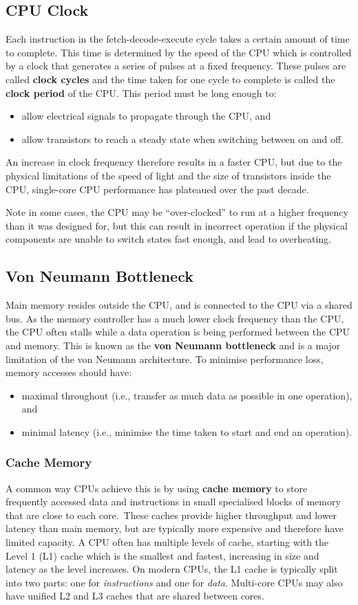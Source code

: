 \documentclass{article}
\begin{document}
\subsection{CPU Clock}
Each instruction in the fetch-decode-execute cycle takes a certain
amount of time to complete. This time is determined by the speed of the
CPU which is controlled by a clock that generates a series of pulses at
a fixed frequency. These pulses are called \textbf{clock cycles} and
the time taken for one cycle to complete is called the \textbf{clock
period} of the CPU. This period must be long enough to:
\begin{itemize}
    \item allow electrical signals to propagate through the CPU, and
    \item allow transistors to reach a steady state when switching
          between on and off.
\end{itemize}
An increase in clock frequency therefore results in a faster CPU, but
due to the physical limitations of the speed of light and the size of
transistors inside the CPU, single-core CPU performance has plateaued
over the past decade.

Note in some cases, the CPU may be ``over-clocked'' to run at a higher
frequency than it was designed for, but this can result in incorrect
operation if the physical components are unable to switch states fast
enough, and lead to overheating.
\subsection{Von Neumann Bottleneck}
Main memory resides outside the CPU, and is connected to the CPU via a
shared bus. As the memory controller has a much lower clock frequency
than the CPU, the CPU often stalls while a data operation is being
performed between the CPU and memory. This is known as the \textbf{von
Neumann bottleneck} and is a major limitation of the von Neumann
architecture. To minimise performance loss, memory accesses should
have:
\begin{itemize}
    \item maximal throughout (i.e., transfer as much data as possible
          in one operation), and
    \item minimal latency (i.e., minimise the time taken to start and
          end an operation).
\end{itemize}
\subsubsection{Cache Memory}
A common way CPUs achieve this is by using \textbf{cache memory} to
store frequently accessed data and instructions in small specialised
blocks of memory that are close to each core.\ These caches provide
higher throughput and lower latency than main memory, but are typically
more expensive and therefore have limited capacity. A CPU often has
multiple levels of cache, starting with the Level 1 (L1) cache which is
the smallest and fastest, increasing in size and latency as the level
increases. On modern CPUs, the L1 cache is typically split into two
parts: one for \textit{instructions} and one for \textit{data}.
Multi-core CPUs may also have unified L2 and L3 caches that are shared
between cores.
\end{document}
